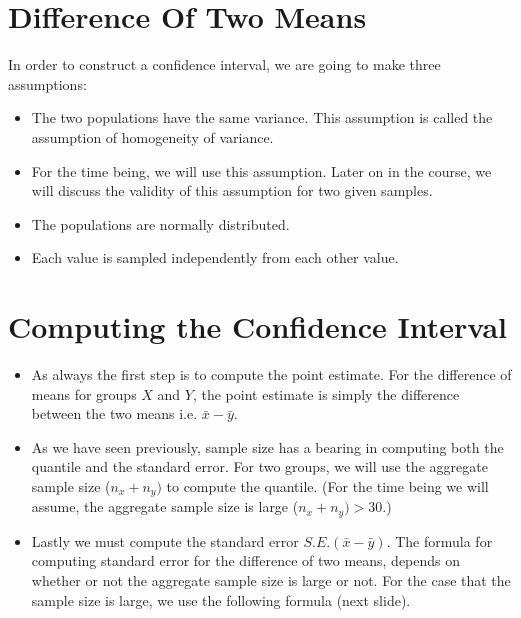 \documentclass[]{report}
\begin{document}
	
	
	\section{Difference Of Two Means}
	In order to construct a confidence interval, we are going to make three assumptions:
	
	\begin{itemize}
		\item The two populations have the same variance. This assumption is called the assumption of homogeneity of variance.
		\item For the time being, we will use this assumption. Later on in the course, we will discuss the validity of this assumption for two given samples.
		\item The populations are normally distributed.
		\item Each value is sampled independently from each other value.
	\end{itemize}
	
	
	
	\section{Computing the Confidence Interval}
	
	\begin{itemize}
		\item As always the first step is to compute the point estimate. For the difference of means for groups $X$ and $Y$, the point estimate is simply the difference between the two means i.e. $\bar{x} - \bar{y}$.
		
		\item As we have seen previously, sample size has a bearing in computing both the quantile and the standard error.
		For two groups, we will use the aggregate sample size ($n_x+n_y)$ to compute the quantile. (For the time being we will assume, the aggregate sample size is large ($n_x+n_y)> 30$.)
		
		\item Lastly we must compute the standard error $S.E.(\bar{x}-\bar{y})$. The formula for computing standard error for the difference of two means, depends on whether or not the aggregate sample size is large or not. For the case that the sample size is large, we use the following formula (next slide).
	\end{itemize}
	
\end{document}

